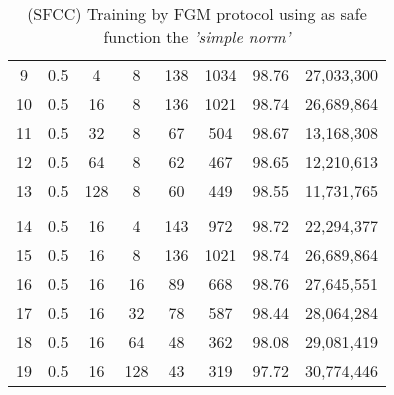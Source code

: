 \begin{table}[H]
\begin{tabular}{|c|c|c|c|c|c|c|c|}
        9                      & 0.5                   & 4                     & 8                     & 138                   & 1034                  & 98.76                 & 27,033,300               \\
        10                     & 0.5                   & 16                    & 8                     & 136                   & 1021                  & 98.74                 & 26,689,864               \\
        11                     & 0.5                   & 32                    & 8                     & 67                    & 504                   & 98.67                 & 13,168,308               \\
        12                     & 0.5                   & 64                    & 8                     & 62                    & 467                   & 98.65                 & 12,210,613               \\
        13                     & 0.5                   & 128                   & 8                     & 60                    & 449                   & 98.55                 & 11,731,765               \\
        \hline
        \multicolumn{1}{|l|}{} & \multicolumn{1}{l|}{} & \multicolumn{1}{l|}{} & \multicolumn{1}{l|}{} & \multicolumn{1}{l|}{} & \multicolumn{1}{l|}{} & \multicolumn{1}{l|}{} & \multicolumn{1}{l|}{}    \\
        \hline
        14                     & 0.5                   & 16                    & 4                     & 143                   & 972                   & 98.72                 & 22,294,377               \\
        15                     & 0.5                   & 16                    & 8                     & 136                   & 1021                  & 98.74                 & 26,689,864               \\
        16                     & 0.5                   & 16                    & 16                    & 89                    & 668                   & 98.76                 & 27,645,551               \\
        17                     & 0.5                   & 16                    & 32                    & 78                    & 587                   & 98.44                 & 28,064,284               \\
        18                     & 0.5                   & 16                    & 64                    & 48                    & 362                   & 98.08                 & 29,081,419               \\
        19                     & 0.5                   & 16                    & 128                   & 43                    & 319                   & 97.72                 & 30,774,446               \\
        \hline
    \end{tabular}
    \caption{(SFCC) Training by FGM protocol using as safe function the \emph{'simple norm'}}
    \label{tab:table-fgm-sf1-class-exp}
\end{table}

